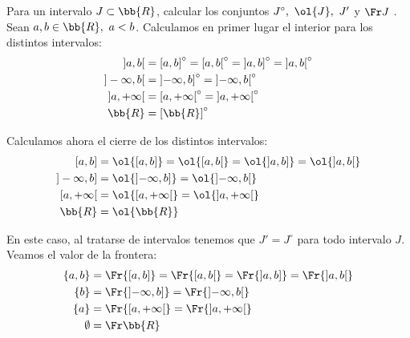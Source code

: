 \begin{ejercicio}
    Para un intervalo $J \subset \bb{R}$, calcular los conjuntos $J^\circ,~\ol{J},~J'$ y $\Fr J$ .\\

    Sean $a,b\in \bb{R},~a<b$. Calculamos en primer lugar el interior para los distintos intervalos:
    \begin{equation*}\begin{split}
        ]a,b[ &= \left[a,b\right]^\circ = \left[a,b\right[^\circ= \left]a,b\right]^\circ= \left]a,b\right[^\circ \\
        ]-\infty, b[ &= \left]-\infty, b\right]^\circ = \left]-\infty,b \right[^\circ\\
        ]a, +\infty[ &= \left[a,+\infty\right[^\circ = \left]a,+\infty\right[^\circ \\
        \bb{R}&=\left[\bb{R}\right]^\circ
    \end{split}\end{equation*}


    Calculamos ahora el cierre de los distintos intervalos:
    \begin{equation*}\begin{split}
        [a,b] &= \ol{\left[a,b\right]} = \ol{\left[a,b\right[}= \ol{\left]a,b\right]}= \ol{\left]a,b\right[} \\
        ]-\infty, b] &= \ol{\left]-\infty, b\right]} = \ol{\left]-\infty,b \right[}\\
        [a, +\infty[ &= \ol{\left[a,+\infty\right[} = \ol{\left]a,+\infty\right[} \\
        \bb{R}&=\ol{\bb{R}}
    \end{split}\end{equation*}

    En este caso, al tratarse de intervalos tenemos que $J'=J^\circ$ para todo intervalo $J$. Veamos el valor de la frontera:
    \begin{equation*}\begin{split}
        \{a,b\} &= \Fr{\left[a,b\right]} = \Fr{\left[a,b\right[}= \Fr{\left]a,b\right]}= \Fr{\left]a,b\right[} \\
        \{b\} &= \Fr{\left]-\infty, b\right]} = \Fr{\left]-\infty,b \right[}\\
        \{a\} &= \Fr{\left[a,+\infty\right[} = \Fr{\left]a,+\infty\right[} \\
        \emptyset&=\Fr \bb{R}
    \end{split}\end{equation*}
\end{ejercicio}

